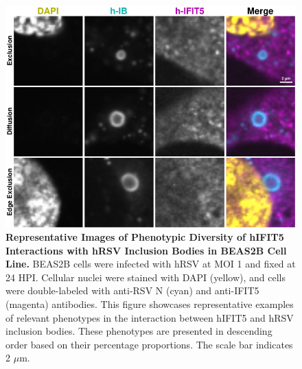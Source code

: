 \begin{figure}
    \centering
    \includegraphics[width=1\linewidth]{08. Chapter 3/Figs/02. Infection/04. IFIT5/06. beas2b i5.pdf}
    \caption[Representative Images of Phenotypic Diversity of hIFIT5 Interactions with hRSV Inclusion Bodies in BEAS2B Cell Line.]{\textbf{Representative Images of Phenotypic Diversity of hIFIT5 Interactions with hRSV Inclusion Bodies in BEAS2B Cell Line.} BEAS2B cells were infected with hRSV at MOI 1 and fixed at 24 HPI. Cellular nuclei were stained with DAPI (yellow), and cells were double-labeled with anti-RSV N (cyan) and anti-IFIT5 (magenta) antibodies. This figure showcases representative examples of relevant phenotypes in the interaction between hIFIT5 and hRSV inclusion bodies. These phenotypes are presented in descending order based on their percentage proportions. The scale bar indicates 2 \(\mu \mbox{m}\).}
    \label{fig:Representative Images of Phenotypic Diversity of hIFIT5 Interactions with hRSV Inclusion Bodies in BEAS2B Cell Line}
\end{figure}

